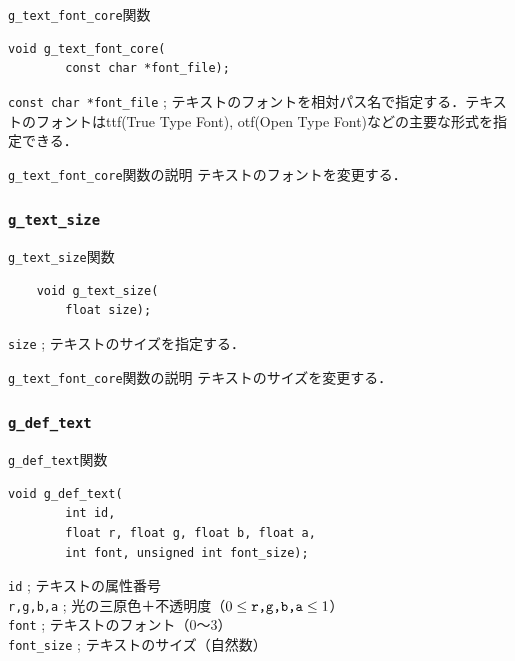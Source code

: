 \documentclass[a4paper,12pt]{jsarticle}%
\begin{document}
\begin{itembox}[l]{\texttt{g\_text\_font\_core}関数}
\begin{verbatim}
void g_text_font_core(
        const char *font_file);
\end{verbatim}
\verb|const char *font_file| ; テキストのフォントを相対パス名で指定する．テキストのフォントはttf(True Type Font), otf(Open Type Font)などの主要な形式を指定できる．\\
\end{itembox}

\begin{itembox}[l]{\texttt{g\_text\_font\_core}関数の説明}
テキストのフォントを変更する．
\end{itembox}

\subsubsection{\texttt{g\_text\_size}}

\begin{itembox}[l]{\texttt{g\_text\_size}関数}
	\begin{verbatim}
	void g_text_size(
        float size);
	\end{verbatim}
	\verb|size| ; テキストのサイズを指定する．\\
\end{itembox}

\begin{itembox}[l]{\texttt{g\_text\_font\_core}関数の説明}
	テキストのサイズを変更する．
\end{itembox}


\clearpage
\subsubsection{\texttt{g\_def\_text}}

\begin{itembox}[l]{\texttt{g\_def\_text}関数}
\begin{verbatim}
void g_def_text(
        int id,
        float r, float g, float b, float a,
        int font, unsigned int font_size);
\end{verbatim}
\verb|id| ; テキストの属性番号\\
\verb|r,g,b,a| ; 光の三原色＋不透明度（$0\leq \verb|r,g,b,a| \leq 1$）\\
\verb|font| ; テキストのフォント（0〜3）\\
\verb|font_size| ; テキストのサイズ（自然数）\\
\end{itembox}
\end{document}
